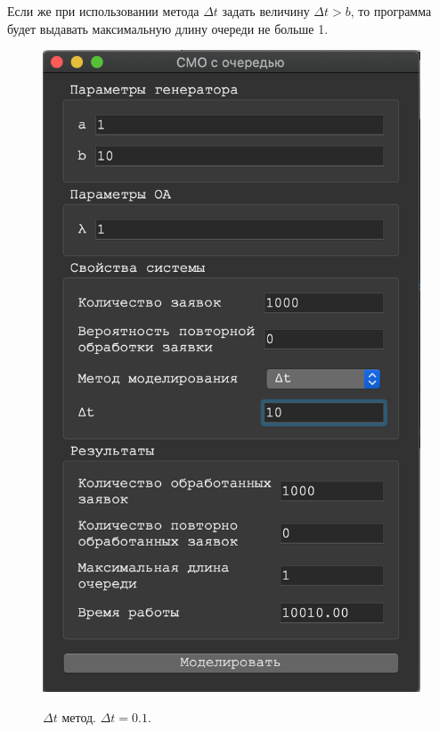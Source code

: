 \documentclass[a4paper,12pt]{article}
\begin{document}
	\newpage
	
	Если же при использовании метода $\Delta t$ задать величину $\Delta t > b$, то программа будет выдавать максимальную длину очереди не больше 1.
	
	\begin{figure}[h!]
		\begin{center}
			{\includegraphics[scale = 0.6]{deltat_2.png}}
			\label{ris:deltat_2}
		\end{center}
		\caption{$\Delta t$ метод. $\Delta t = 0.1$.}
	\end{figure}
	
\end{document}
